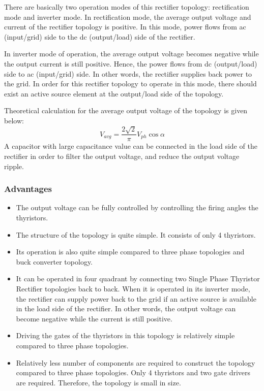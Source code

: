 There are basically two operation modes of this rectifier topology: rectification mode and inverter mode.
In rectification mode, the average output voltage and current of the rectifier topology is positive. In this mode, power flows from ac (input/grid) side to the dc (output/load) side of the rectifier.

In inverter mode of operation, the average output voltage becomes negative while the output current is still positive. Hence, the power flows from dc (output/load) side to ac (input/grid) side. In other words, the rectifier supplies back power to the grid. In order for this rectifier topology to operate in this mode, there should exist an active source element at the output/load side of the topology. 

Theoretical calculation for the average output voltage of the topology is given below:
\begin{equation}
    V_{avg} = \frac{2 \sqrt{2}}{\pi} V_{ph} \cos{\alpha} 
\end{equation}
A capacitor with large capacitance value can be connected in the load side of the rectifier in order to filter the output voltage, and reduce the output voltage ripple.

\subsubsection{Advantages}
\begin{itemize}
    \item The output voltage can be fully controlled by controlling the firing angles the thyristors.
    \item The structure of the topology is quite simple. It consists of only 4 thyristors.
    \item Its operation is also quite simple compared to three phase topologies and buck converter topology.
    \item It can be operated in four quadrant by connecting two Single Phase Thyristor Rectifier topologies back to back. When it is operated in its inverter mode, the rectifier can supply power back to the grid if an active source is available in the load side of the rectifier. In other words, the output voltage can become negative while the current is still positive.
    \item Driving the gates of the thyristors in this topology is relatively simple compared to three phase topologies.
    \item Relatively less number of components are required to construct the topology compared to three phase topologies. Only 4 thyristors and two gate drivers are required. Therefore, the topology is small in size.
\end{itemize}
